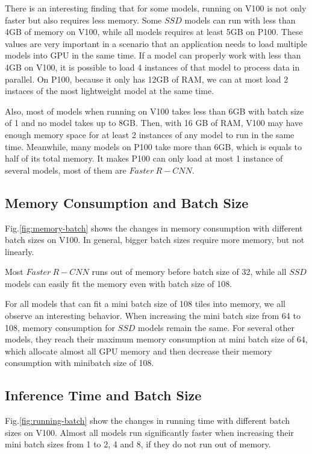 \documentclass[conference]{IEEEtran}
\begin{document}
There is an interesting finding that for some models, running on V100 is not only faster but also requires less memory. Some $SSD$ models can run with less than 4GB of memory on V100, while all models requires at least 5GB on P100. These values are very important in a scenario that an application needs to load multiple models into GPU in the same time. If a model can properly work with less than 4GB on V100, it is possible to load 4 instances of that model to process data in parallel. On P100, because it only has 12GB of RAM, we can at most load 2 instaces of the most lightweight model at the same time.

Also, most of models when running on V100 takes less than 6GB with batch size of 1 and no model takes up to 8GB. Then, with 16 GB of RAM, V100 may have enough memory space for at least 2 instances of any model to run in the same time. Meanwhile, many models on P100 take more than 6GB, which is equals to half of its total memory. It makes P100 can only load at most 1 instance of several models, most of them are $Faster\ R-CNN$. 

\subsection{Memory Consumption and Batch Size}
Fig.\ref{fig:memory-batch} shows the changes in memory consumption with different batch sizes on V100. In general, bigger batch sizes require more memory, but not linearly. 

Most $Faster\ R-CNN$ runs out of memory before batch size of 32, while all $SSD$ models can easily fit the memory even with batch size of 108. 

For all models that can fit a mini batch size of 108 tiles into memory, we all observe an interesting behavior. When increasing the mini batch size from 64 to 108, memory consumption for $SSD$ models remain the same. For several other models, they reach their maximum memory consumption at mini batch size of 64, which allocate almost all GPU memory and then decrease their memory consumption with minibatch size of 108. 

\subsection{Inference Time and Batch Size}
Fig.\ref{fig:running-batch} show the changes in running time with different batch sizes on V100. Almost all models run significantly faster when increasing their mini batch sizes from 1 to 2, 4 and 8, if they do not run out of memory.
\end{document}
